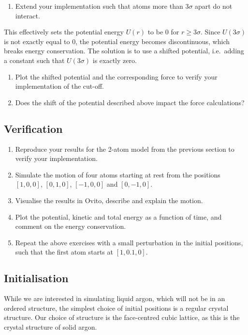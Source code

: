 \documentclass[11pt,british,a4paper]{report}
\begin{document}
\begin{enumerate}[label=\roman*., resume]
    \item Extend your implementation such that atoms more than \(3\sigma\) apart do not interact.
\end{enumerate}

This effectively sets the potential energy \(U(r)\) to be \(0\) for \(r\geq 3\sigma\). Since \(U(3\sigma)\) is not exactly equal to \(0\), the potential energy becomes discontinuous, which breaks energy conservation. The solution is to use a shifted potential, i.e.\ adding a constant such that \(U(3\sigma)\) is exactly zero.

\begin{enumerate}[label=\roman*., resume]
    \item Plot the shifted potential and the corresponding force to verify your implementation of the cut-off.
    \item Does the shift of the potential described above impact the force calculations?
\end{enumerate}

\subsection{Verification}
\begin{enumerate}[label=\roman*.]
     \item Reproduce your results for the 2-atom model from the previous section to verify your implementation.
    \item Simulate the motion of four atoms starting at rest from the positions \([1,0,0]\), \([0,1,0]\), \([-1,0,0]\) and \([0,-1,0]\).
    \item Visualise the results in Ovito, describe and explain the motion.
    \item Plot the potential, kinetic and total energy as a function of time, and comment on the energy conservation.
    \item Repeat the above exercises with a small perturbation in the initial positions, such that the first atom starts at \([1,0.1,0]\).
\end{enumerate}

\subsection{Initialisation}
While we are interested in simulating liquid argon, which will not be in an ordered structure, the simplest choice of initial positions is a regular crystal structure. Our choice of structure is the face-centred cubic lattice, as this is the crystal structure of solid argon.
\end{document}
